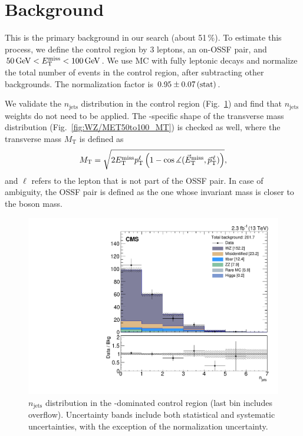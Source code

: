 \section{\texorpdfstring{\WZ}{WZ} Background}
\label{sec:bkg_WZ}

This is the primary background in our search (about 51\,\%). To estimate this process, we define the \WZ control region by 3 leptons, an on-\Z OSSF pair, and $50\,\text{Ge\hspace{-.08em}V} < E_{\mathrm{T}}^{\text{miss}} < 100\,\text{Ge\hspace{-.08em}V}$. We use \WZ MC with fully leptonic decays and normalize the total number of events in the control region, after subtracting other backgrounds. The normalization factor is $0.95 \pm 0.07\,\text{(stat)}$.

We validate the $n_\textrm{jets}$ distribution in the control region (Fig.~\ref{fig:WZ/NGOODJETS}) and find that $n_\textrm{jets}$ weights do not need to be applied. The \WZ-specific shape of the transverse mass distribution (Fig.~\ref{fig:WZ/MET50to100_MT}) is checked as well, where the transverse mass $M_\textrm{T}$ is defined as
$$M_\textrm{T} = \sqrt{2 E_{\mathrm{T}}^{\text{miss}} p_\textrm{T}^\ell \left( 1 - \cos\measuredangle(\vec E_\textrm{T}^\text{miss}, \vec p_\textrm{T}^{\,\ell}) \right)},$$ and $\ell$ refers to the lepton that is not part of the OSSF pair. In case of ambiguity, the OSSF pair is defined as the one whose invariant mass is closer to the \Z boson mass.

\begin{figure}
\begin{center}
	\includegraphics[width=.7\textwidth]{Background/bkg_WZ/WZ_MET50to100_NGOODJETS}
	\caption{$n_\textrm{jets}$ distribution in the \WZ-dominated control region (last bin includes overflow). Uncertainty bands include both statistical and systematic uncertainties, with the exception of the \WZ normalization uncertainty.
	\label{fig:WZ/NGOODJETS}}
\end{center}
\end{figure}

